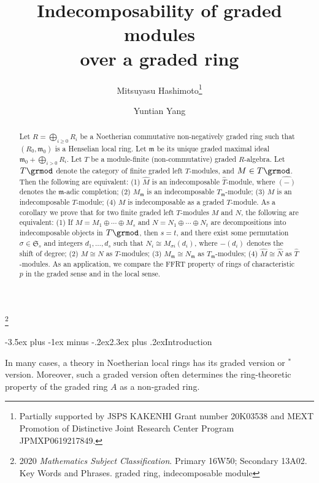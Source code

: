 \documentclass[11pt,leqno]{article}
\title{Indecomposability of graded modules\\over a graded ring}
\author{M{\sc itsuyasu} H{\sc ashimoto}\thanks{Partially supported by JSPS KAKENHI Grant number 20K03538
    and MEXT Promotion of Distinctive Joint Research Center Program JPMXP0619217849.}
  \and
  Y{\sc untian} Y{\sc ang}}
\date{}
\makeatletter
\theoremstyle{definition}
\theoremstyle{remark}
\theoremstyle{remark}
\newcommand{\fm}{\ensuremath{\mathfrak m}}
\let\frak\mathfrak
\def\fm{\mathfrak{m}}
\def\section{\@startsection{section}{1}{\z@ }%
  {-3.5ex plus -1ex minus -.2ex}{2.3ex plus .2ex}{\bf }}
\makeatother
\begin{document}
\maketitle
\footnote[0]
{2020 \textit{Mathematics Subject Classification}. 
  Primary 16W50; Secondary 13A02.
  Key Words and Phrases.
  graded ring, indecomposable module
}

\begin{abstract}
  Let $R=\bigoplus_{i\geq 0}R_i$ be a Noetherian commutative non-negatively graded ring such that $(R_0,\fm_0)$ is a
  Henselian local ring.
  Let $\fm$ be its unique graded maximal ideal $\fm_0+\bigoplus_{i>0}R_i$.
  Let $T$ be a module-finite (non-commutative) graded $R$-algebra.
  Let $T\grmod$ denote the category of finite graded left $T$-modules,
  and $M\in T\grmod$.
  Then the following are equivalent:
  (1) $\hat M$ is an indecomposable $\hat T$-module, where $\widehat{(-)}$ denotes the $\fm$-adic completion;
  (2) $M_\fm$ is an indecomposable $T_\fm$-module;
  (3) $M$ is an indecomposable $T$-module;
  (4) $M$ is indecomposable as a graded $T$-module.
  As a corollary we prove that for two finite graded left $T$-modules $M$ and $N$, the following are equivalent:
  (1) If $M=M_1\oplus\cdots\oplus M_s$ and $N=N_1\oplus\cdots\oplus N_t$ are
    decompositions into indecomposable objects in $T\grmod$, then $s=t$, and
    there exist some permutation $\sigma\in \frak S_s$ and integers $d_1,\ldots,d_s$
    such that $N_i\cong M_{\sigma i}(d_i)$, where $-(d_i)$ denotes the shift of degree;
  (2) $M\cong N$ as $T$-modules;
  (3) $M_\fm\cong N_\fm$ as $T_\fm$-modules;
    (4) $\hat M\cong \hat N$ as $\hat T$-modules.
    As an application, we compare the FFRT property of rings of characteristic $p$ in the
    graded sense and in the local sense.
\end{abstract}

\section{Introduction}

In many cases, a theory in Noetherian local rings has its graded version
or ${}^*$version.
Moreover, such a graded version often determines the ring-theoretic property of the graded ring $A$
as a non-graded ring.
\end{document}
